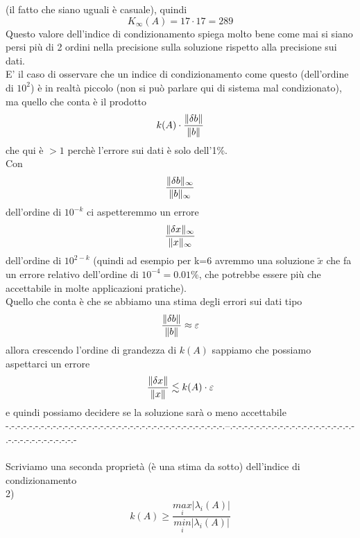 \documentclass[12pt,a4paper]{article}
\DeclarePairedDelimiter{\norma}{\lVert}{\rVert}
\begin{document}
(il fatto che siano uguali è casuale), quindi
\begin{equation*}
    K_\infty(A) = 17 \cdot 17 = 289
\end{equation*}
Questo valore dell'indice di condizionamento spiega molto bene come mai si siano persi più di 2 ordini nella precisione sulla soluzione rispetto alla precisione sui dati.\\
E' il caso di osservare che un indice di condizionamento come questo (dell'ordine di $10^2$) è in realtà piccolo (non si può parlare qui di sistema mal condizionato), ma quello che conta è il prodotto
\begin{equation*}
   k(A)\cdot \frac{\norma{\delta b}}{\norma{b}}
\end{equation*} che qui è $>1$ perchè l'errore sui dati è solo dell'1\%.\\Con 
\begin{equation*}
    \frac{\norma{\delta b}_\infty}{\norma{b}_\infty}
\end{equation*} 
dell'ordine di $10^{-k}$ ci aspetteremmo un errore 
\begin{equation*}
    \frac{\norma{\delta x}_\infty}{\norma{x}_\infty} 
\end{equation*}dell'ordine di $10^{2-k}$ (quindi ad esempio per k=6 avremmo una soluzione $\tilde{x}$ che fa un errore relativo dell'ordine di $10^{-4}=0.01\%$, che potrebbe essere più che accettabile in molte applicazioni pratiche).\\
Quello che conta è che se abbiamo una stima degli errori sui dati tipo
\begin{equation*}
    \frac{\norma{\delta b}}{\norma{b}}\approx \varepsilon
\end{equation*} allora crescendo l'ordine di grandezza di $k(A)$ sappiamo che possiamo aspettarci un errore 
\begin{equation*}
    \frac{\norma{\delta x}}{\norma{x}}\lesssim k(A)\cdot\varepsilon
\end{equation*}
e quindi possiamo decidere se la soluzione sarà o meno accettabile\\
-.-.-.-.-.-.-.-.-.-.-.-.-.-.-.-.-.-.-.-.-.-.-.-.-.-.-.-.-.-.-.-.-.-.-.-.-.--.-.-.-.-.-.-.-.-.-.-.-.-.-.-.-.-.-.-.-.-.-.-.-.-.-.-.-.-.-.-.-.-.-
\\\\
Scriviamo una seconda proprietà (è una stima da sotto) dell'indice di condizionamento \\
2)
\begin{equation*}
    k(A)\geq\frac{\underset{i}{max}|\lambda_i(A)|}{\underset{i}{min}|\lambda_i(A)|}
\end{equation*}
\end{document}
